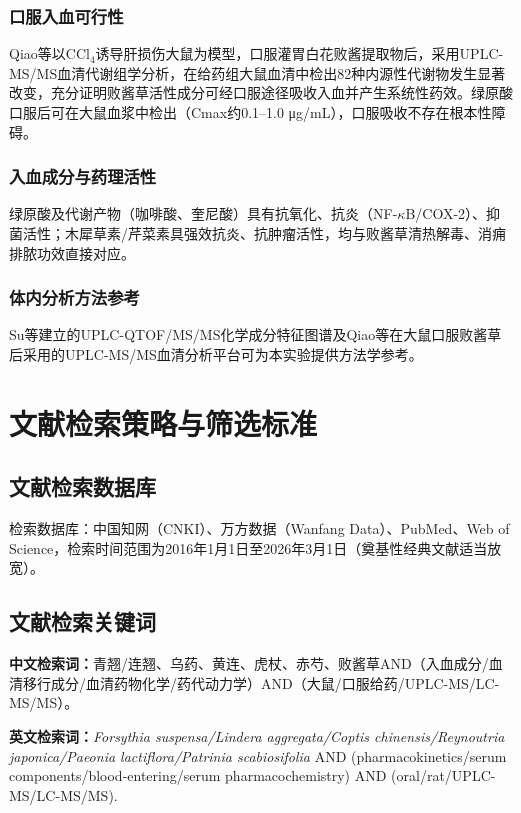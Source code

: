 \documentclass[12pt,a4paper,UTF8,openany]{ctexbook}
\begin{document}
\subsubsection{口服入血可行性}

Qiao等\cite{Qiao2022}以CCl$_4$诱导肝损伤大鼠为模型，口服灌胃白花败酱提取物后，采用UPLC-MS/MS血清代谢组学分析，在给药组大鼠血清中检出82种内源性代谢物发生显著改变，充分证明败酱草活性成分可经口服途径吸收入血并产生系统性药效。绿原酸口服后可在大鼠血浆中检出（Cmax约0.1--1.0 μg/mL），口服吸收不存在根本性障碍。

\subsubsection{入血成分与药理活性}

绿原酸及代谢产物（咖啡酸、奎尼酸）具有抗氧化、抗炎（NF-$\kappa$B/COX-2）、抑菌活性；木犀草素/芹菜素具强效抗炎、抗肿瘤活性，均与败酱草清热解毒、消痈排脓功效直接对应\cite{Gong2021}。

\subsubsection{体内分析方法参考}

Su等\cite{Su2022}建立的UPLC-QTOF/MS/MS化学成分特征图谱及Qiao等\cite{Qiao2022}在大鼠口服败酱草后采用的UPLC-MS/MS血清分析平台可为本实验提供方法学参考。

\section{文献检索策略与筛选标准}

\subsection{文献检索数据库}

检索数据库：中国知网（CNKI）、万方数据（Wanfang Data）、PubMed、Web of Science，检索时间范围为2016年1月1日至2026年3月1日（奠基性经典文献适当放宽）。

\subsection{文献检索关键词}

\textbf{中文检索词：}青翘/连翘、乌药、黄连、虎杖、赤芍、败酱草AND（入血成分/血清移行成分/血清药物化学/药代动力学）AND（大鼠/口服给药/UPLC-MS/LC-MS/MS）。

\textbf{英文检索词：}\textit{Forsythia suspensa/Lindera aggregata/Coptis chinensis/Reynoutria japonica/Paeonia lactiflora/Patrinia scabiosifolia} AND (pharmacokinetics/serum components/blood-entering/serum pharmacochemistry) AND (oral/rat/UPLC-MS/LC-MS/MS).
\end{document}
